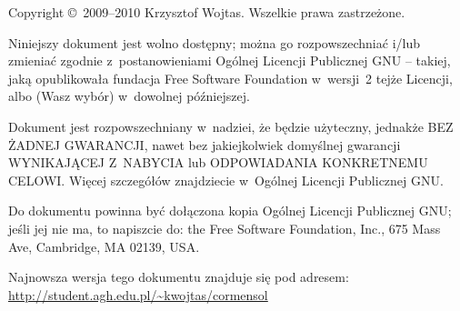 		\vspace{10ex}

		\begin{small}
			Copyright \copyright\ 2009--2010 Krzysztof Wojtas. Wszelkie prawa zastrzeżone.

			Niniejszy dokument jest wolno dostępny; można go rozpowszechniać i/lub zmieniać zgodnie z~postanowieniami Ogólnej Licencji Publicznej GNU -- takiej, jaką opublikowała fundacja Free Software Foundation w~wersji~2 tejże Licencji, albo (Wasz wybór) w~dowolnej późniejszej.

			Dokument jest rozpowszechniany w~nadziei, że będzie użyteczny, jednakże BEZ ŻADNEJ GWARANCJI, nawet bez jakiejkolwiek domyślnej gwarancji WYNIKAJĄCEJ Z~NABYCIA lub ODPOWIADANIA KONKRETNEMU CELOWI\@. Więcej szczegółów znajdziecie w~Ogólnej Licencji Publicznej GNU\@.

			Do dokumentu powinna być dołączona kopia Ogólnej Licencji Publicznej GNU; jeśli jej nie ma, to napiszcie do: the Free Software Foundation, Inc., 675 Mass Ave, Cambridge, MA 02139, USA\@.
		\end{small}

	\endgroup


	\noindent Najnowsza wersja tego dokumentu znajduje się pod adresem:\\
	\url{http://student.agh.edu.pl/~kwojtas/cormensol}

	\newpage

\endgroup

\endinput
